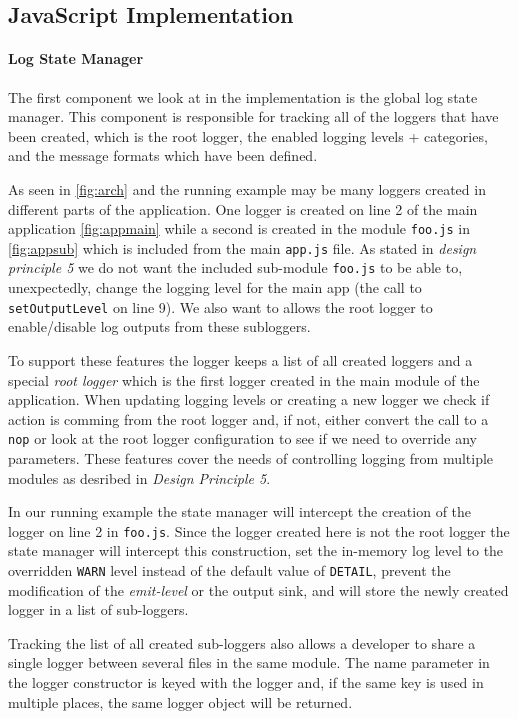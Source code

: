 \subsection{JavaScript Implementation}
\label{subsec:jsimpl}
\paragraph{Log State Manager}
\noindent
The first component we look at in the implementation is the global log state 
manager. This component is responsible for tracking all of the loggers that 
have been created, which is the root logger, the enabled logging levels + 
categories, and the message formats which have been defined. 

As seen in \autoref{fig:arch} and the running example may be many loggers 
created in different parts of the application. One logger is created on line 
2 of the main application \autoref{fig:appmain} while a second is created 
in the module \texttt{foo.js} in \autoref{fig:appsub} which is included from 
the main \texttt{app.js} file. As stated in \emph{design principle 5} we 
do not want the included sub-module \texttt{foo.js} to be able to, unexpectedly, 
change the logging level for the main app (the call to \texttt{setOutputLevel} on 
line 9). We also want to allows the root logger to enable/disable log outputs 
from these subloggers. 

To support these features the \projn logger keeps a list of all created loggers 
and a special \emph{root logger} which is the first logger created in the main 
module of the application. When updating logging levels or creating a new logger 
we check if action is comming from the root logger and, if not, either convert 
the call to a \texttt{nop} or look at the root logger configuration to see if 
we need to override any parameters. These features cover the needs of controlling 
logging from multiple modules as desribed in \emph{Design Principle 5}.

In our running example the state manager will intercept the creation of the logger 
on line 2 in \texttt{foo.js}. Since the logger created here is not the root logger
the state manager will intercept this construction, set the in-memory log level to 
the overridden \texttt{WARN} level instead of the default value of \texttt{DETAIL}, 
prevent the modification of the \emph{emit-level} or the output sink, and will 
store the newly created logger in a list of sub-loggers. 

Tracking the list of all created sub-loggers also allows a developer to share a 
single logger between several files in the same module. The name parameter in the 
logger constructor is keyed with the logger and, if the same key is used in multiple 
places, the same logger object will be returned.

